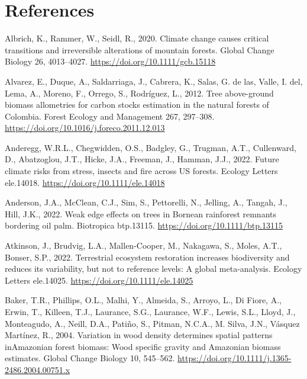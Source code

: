 \documentclass[
  12pt,
]{article}
\newlength{\cslhangindent}
\newlength{\cslentryspacingunit} %
\newenvironment{CSLReferences}[2] %
 {%
  \setlength{\parindent}{0pt}
  \ifodd #1
  \let\oldpar\par
  \def\par{\hangindent=\cslhangindent\oldpar}
  \fi
  \setlength{\parskip}{#2\cslentryspacingunit}
 }%
 {}
\begin{document}
\hypertarget{references}{%
\section*{References}\label{references}}

\hypertarget{refs}{}
\begin{CSLReferences}{1}{0}
\leavevmode{}%
Albrich, K., Rammer, W., Seidl, R., 2020. Climate change causes critical transitions and irreversible alterations of mountain forests. Global Change Biology 26, 4013--4027. \url{https://doi.org/10.1111/gcb.15118}

\leavevmode{}%
Alvarez, E., Duque, A., Saldarriaga, J., Cabrera, K., Salas, G. de las, Valle, I. del, Lema, A., Moreno, F., Orrego, S., Rodríguez, L., 2012. Tree above-ground biomass allometries for carbon stocks estimation in the natural forests of {Colombia}. Forest Ecology and Management 267, 297--308. \url{https://doi.org/10.1016/j.foreco.2011.12.013}

\leavevmode{}%
Anderegg, W.R.L., Chegwidden, O.S., Badgley, G., Trugman, A.T., Cullenward, D., Abatzoglou, J.T., Hicke, J.A., Freeman, J., Hamman, J.J., 2022. Future climate risks from stress, insects and fire across {US} forests. Ecology Letters ele.14018. \url{https://doi.org/10.1111/ele.14018}

\leavevmode{}%
Anderson, J.A., McClean, C.J., Sim, S., Pettorelli, N., Jelling, A., Tangah, J., Hill, J.K., 2022. Weak edge effects on trees in {Bornean} rainforest remnants bordering oil palm. Biotropica btp.13115. \url{https://doi.org/10.1111/btp.13115}

\leavevmode{}%
Atkinson, J., Brudvig, L.A., Mallen-Cooper, M., Nakagawa, S., Moles, A.T., Bonser, S.P., 2022. Terrestrial ecosystem restoration increases biodiversity and reduces its variability, but not to reference levels: {A} global meta-analysis. Ecology Letters ele.14025. \url{https://doi.org/10.1111/ele.14025}

\leavevmode{}%
Baker, T.R., Phillips, O.L., Malhi, Y., Almeida, S., Arroyo, L., Di Fiore, A., Erwin, T., Killeen, T.J., Laurance, S.G., Laurance, W.F., Lewis, S.L., Lloyd, J., Monteagudo, A., Neill, D.A., Patiño, S., Pitman, N.C.A., M. Silva, J.N., Vásquez Martínez, R., 2004. Variation in wood density determines spatial patterns {inAmazonian} forest biomass: {Wood} specific gravity and {Amazonian} biomass estimates. Global Change Biology 10, 545--562. \url{https://doi.org/10.1111/j.1365-2486.2004.00751.x}


\end{CSLReferences}
\end{document}
